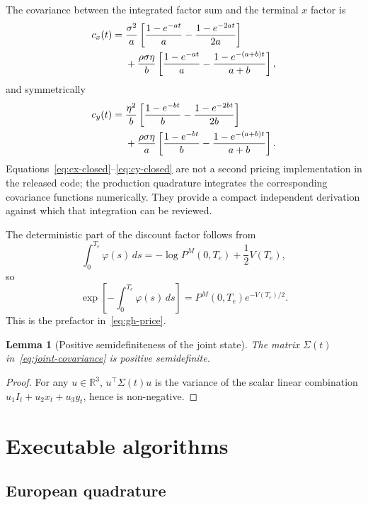\documentclass[11pt]{article}
\numberwithin{equation}{section}
\newtheorem{lemma}[proposition]{Lemma}
\theoremstyle{definition}
\theoremstyle{remark}
\begin{document}
The covariance between the integrated factor sum and the terminal $x$ factor is
\begin{align}
c_x(t)={}&
\frac{\sigma^2}{a}
\left[\frac{1-e^{-at}}{a}-\frac{1-e^{-2at}}{2a}\right]\notag\\
&+\frac{\rho\sigma\eta}{b}
\left[\frac{1-e^{-at}}{a}
-\frac{1-e^{-(a+b)t}}{a+b}\right],
\label{eq:cx-closed}
\end{align}
and symmetrically
\begin{align}
c_y(t)={}&
\frac{\eta^2}{b}
\left[\frac{1-e^{-bt}}{b}-\frac{1-e^{-2bt}}{2b}\right]\notag\\
&+\frac{\rho\sigma\eta}{a}
\left[\frac{1-e^{-bt}}{b}
-\frac{1-e^{-(a+b)t}}{a+b}\right].
\label{eq:cy-closed}
\end{align}
Equations~\eqref{eq:cx-closed}--\eqref{eq:cy-closed} are not a second pricing
implementation in the released code; the production quadrature integrates the
corresponding covariance functions numerically. They provide a compact
independent derivation against which that integration can be reviewed.

The deterministic part of the discount factor follows from
\[
  \int_0^{T_e}\varphi(s)\,ds
  =-\log P^M(0,T_e)+\frac12V(T_e),
\]
so
\[
  \exp\left[-\int_0^{T_e}\varphi(s)\,ds\right]
  =P^M(0,T_e)e^{-V(T_e)/2}.
\]
This is the prefactor in~\eqref{eq:gh-price}.

\begin{lemma}[Positive semidefiniteness of the joint state]
The matrix $\Sigma(t)$ in~\eqref{eq:joint-covariance} is positive semidefinite.
\end{lemma}
\begin{proof}
For any $u\in\mathbb{R}^3$,
$u^\top\Sigma(t)u$ is the variance of the scalar linear combination
$u_1I_t+u_2x_t+u_3y_t$, hence is non-negative.
\end{proof}

\section{Executable algorithms}
\label{app:algorithms}

\subsection{European quadrature}
\end{document}
